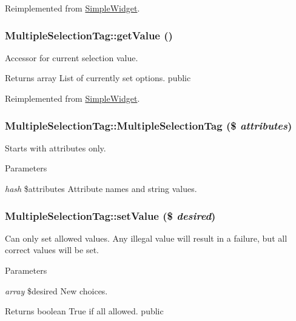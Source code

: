 Reimplemented from \hyperlink{class_simple_widget_a9c0702cdfee1237b1599cb920ce14ba6}{SimpleWidget}.\hypertarget{class_multiple_selection_tag_a4a3e75f773c42108d27fdc5c73cb0d55}{
\subsubsection[{getValue}]{\setlength{\rightskip}{0pt plus 5cm}MultipleSelectionTag::getValue ()}}
\label{class_multiple_selection_tag_a4a3e75f773c42108d27fdc5c73cb0d55}
Accessor for current selection value. \begin{DoxyReturn}{Returns}
array List of currently set options.  public 
\end{DoxyReturn}


Reimplemented from \hyperlink{class_simple_widget_a92328cffb96f6966d6a6a07827e65f6d}{SimpleWidget}.\hypertarget{class_multiple_selection_tag_ad6478ee354b87d1f8a4824e191d9f8ec}{
\subsubsection[{MultipleSelectionTag}]{\setlength{\rightskip}{0pt plus 5cm}MultipleSelectionTag::MultipleSelectionTag (\$ {\em attributes})}}
\label{class_multiple_selection_tag_ad6478ee354b87d1f8a4824e191d9f8ec}
Starts with attributes only. 
\begin{DoxyParams}{Parameters}
\item[{\em hash}]\$attributes Attribute names and string values. \end{DoxyParams}
\hypertarget{class_multiple_selection_tag_a856ea3732ddfc727b1196ac769d5e487}{
\subsubsection[{setValue}]{\setlength{\rightskip}{0pt plus 5cm}MultipleSelectionTag::setValue (\$ {\em desired})}}
\label{class_multiple_selection_tag_a856ea3732ddfc727b1196ac769d5e487}
Can only set allowed values. Any illegal value will result in a failure, but all correct values will be set. 
\begin{DoxyParams}{Parameters}
\item[{\em array}]\$desired New choices. \end{DoxyParams}
\begin{DoxyReturn}{Returns}
boolean True if all allowed.  public 
\end{DoxyReturn}


